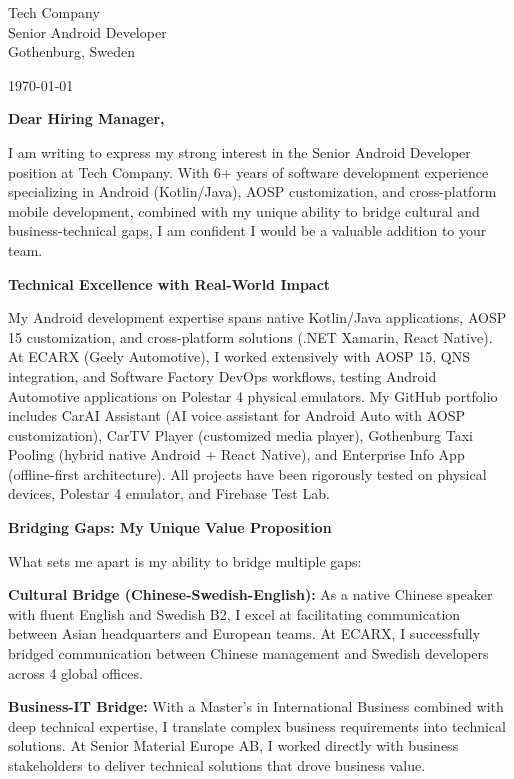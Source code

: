 \documentclass[a4paper,10pt]{article}
\begin{document}
\pagestyle{empty} %

{\color{linkedinblue}
Tech Company\\
Senior Android Developer\\
Gothenburg, Sweden}

\vspace{14pt}

\today

\vspace{16pt}

\textbf{Dear Hiring Manager,}

\vspace{8pt}

I am writing to express my strong interest in the Senior Android Developer position at Tech Company. With 6+ years of software development experience specializing in Android (Kotlin/Java), AOSP customization, and cross-platform mobile development, combined with my unique ability to bridge cultural and business-technical gaps, I am confident I would be a valuable addition to your team.

\textbf{Technical Excellence with Real-World Impact}

My Android development expertise spans native Kotlin/Java applications, AOSP 15 customization, and cross-platform solutions (.NET Xamarin, React Native). At ECARX (Geely Automotive), I worked extensively with AOSP 15, QNS integration, and Software Factory DevOps workflows, testing Android Automotive applications on Polestar 4 physical emulators. My GitHub portfolio includes CarAI Assistant (AI voice assistant for Android Auto with AOSP customization), CarTV Player (customized media player), Gothenburg Taxi Pooling (hybrid native Android + React Native), and Enterprise Info App (offline-first architecture). All projects have been rigorously tested on physical devices, Polestar 4 emulator, and Firebase Test Lab.

\textbf{Bridging Gaps: My Unique Value Proposition}

What sets me apart is my ability to bridge multiple gaps:

\textbf{Cultural Bridge (Chinese-Swedish-English):} As a native Chinese speaker with fluent English and Swedish B2, I excel at facilitating communication between Asian headquarters and European teams. At ECARX, I successfully bridged communication between Chinese management and Swedish developers across 4 global offices.

\textbf{Business-IT Bridge:} With a Master's in International Business combined with deep technical expertise, I translate complex business requirements into technical solutions. At Senior Material Europe AB, I worked directly with business stakeholders to deliver technical solutions that drove business value.
\end{document}
